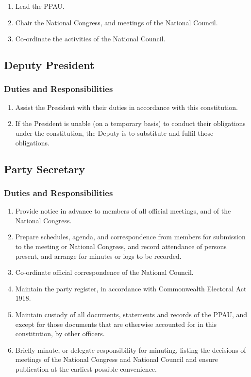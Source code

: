 \documentclass[a4paper,titlepage,8.5pt]{article}
\begin{document}
\begin{enumerate}
\item Lead the PPAU.
\item Chair the National Congress, and meetings of the National Council.
\item Co-ordinate the activities of the National Council.
\end{enumerate}

\subsection{Deputy President}

\subsubsection{Duties and Responsibilities}

\begin{enumerate}
\item Assist the President with their duties in accordance with this constitution.
\item If the President is unable (on a temporary basis) to conduct their obligations under the constitution, the Deputy is to substitute and fulfil those obligations.
\end{enumerate}

\subsection{Party Secretary}

\subsubsection{Duties and Responsibilities}

\begin{enumerate}
\item Provide notice in advance to members of all official meetings, and of the National Congress.
\item Prepare schedules, agenda, and correspondence from members for submission to the meeting or National Congress, and record attendance of persons present, and arrange for minutes or logs to be recorded.
\item Co-ordinate official correspondence of the National Council.
\item Maintain the party register, in accordance with Commonwealth Electoral Act 1918.
\item Maintain custody of all documents, statements and records of the PPAU, and except for those documents that are otherwise accounted for in this constitution, by other officers.
\item Briefly minute, or delegate responsibility for minuting, listing the decisions of meetings of the National Congress and National Council and ensure publication at the earliest possible convenience.
\end{enumerate}
\end{document}
